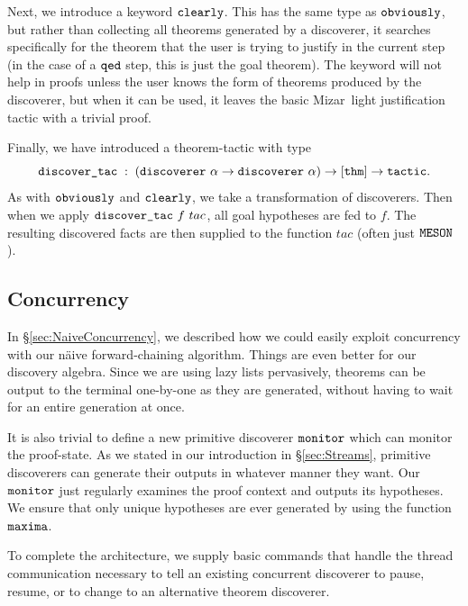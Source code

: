 Next, we introduce a keyword $\texttt{clearly}$. This has the same type as $\texttt{obviously}$, but rather than collecting all theorems generated by a discoverer, it searches specifically for the theorem that the user is trying to justify in the current step (in the case of a $\texttt{qed}$ step, this is just the goal theorem). The keyword will not help in proofs unless the user knows the form of theorems produced by the discoverer, but when it can be used, it leaves the basic Mizar~light justification tactic with a trivial proof.

Finally, we have introduced a theorem-tactic  with type
\begin{displaymath}
\code{discover\_tac}\;:\;(\code{discoverer}\ \alpha\rightarrow\code{discoverer}\ \alpha) \rightarrow [\code{thm}] \rightarrow \code{tactic}.
\end{displaymath}
As with $\texttt{obviously}$ and $\texttt{clearly}$, we take a transformation of discoverers. Then when we apply $\texttt{discover\_tac}\ f\ tac$,  all goal hypotheses are fed to $f$. The resulting discovered facts are then supplied to the function $tac$ (often just $\texttt{MESON}$).

\subsection{Concurrency}
In \S\ref{sec:NaiveConcurrency}, we described how we could easily exploit concurrency with our n\"{a}ive forward-chaining algorithm. Things are even better for our discovery algebra. Since we are using lazy lists pervasively, theorems can be output to the terminal one-by-one as they are generated, without having to wait for an entire generation at once.

It is also trivial to define a new primitive discoverer $\texttt{monitor}$ which can monitor the proof-state. As we stated in our introduction in \S\ref{sec:Streams}, primitive discoverers can generate their outputs in whatever manner they want. Our $\texttt{monitor}$ just regularly examines the proof context and outputs its hypotheses. We ensure that only unique hypotheses are ever generated by using the function $\texttt{maxima}$.

To complete the architecture, we supply basic commands that handle the thread communication necessary to tell an existing concurrent discoverer to pause, resume, or to change to an alternative theorem discoverer.


